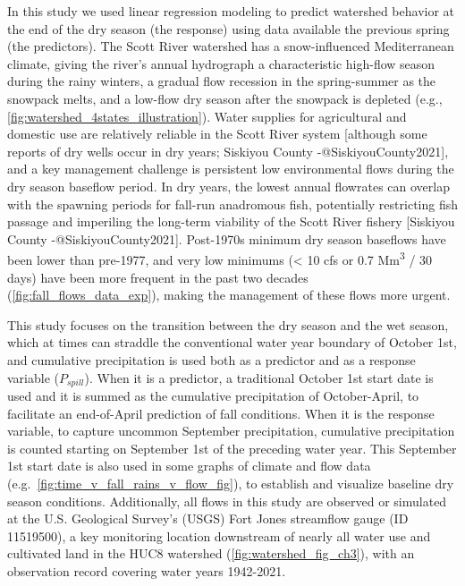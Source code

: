 \documentclass[
]{article}
\begin{document}
In this study we used linear regression modeling to predict watershed
behavior at the end of the dry season (the response) using data
available the previous spring (the predictors). The Scott River
watershed has a snow-influenced Mediterranean climate, giving the
river's annual hydrograph a characteristic high-flow season during the
rainy winters, a gradual flow recession in the spring-summer as the
snowpack melts, and a low-flow dry season after the snowpack is depleted
(e.g., \autoref{fig:watershed_4states_illustration}). Water supplies for
agricultural and domestic use are relatively reliable in the Scott River
system {[}although some reports of dry wells occur in dry years;
Siskiyou County -@SiskiyouCounty2021{]}, and a key management challenge
is persistent low environmental flows during the dry season baseflow
period. In dry years, the lowest annual flowrates can overlap with the
spawning periods for fall-run anadromous fish, potentially restricting
fish passage and imperiling the long-term viability of the Scott River
fishery {[}Siskiyou County -@SiskiyouCounty2021{]}. Post-1970s minimum
dry season baseflows have been lower than pre-1977, and very low
minimums (\textless{} 10 cfs or 0.7 Mm\textsuperscript{3} / 30 days)
have been more frequent in the past two decades
(\autoref{fig:fall_flows_data_exp}), making the management of these
flows more urgent.

This study focuses on the transition between the dry season and the wet
season, which at times can straddle the conventional water year boundary
of October 1st, and cumulative precipitation is used both as a predictor
and as a response variable (\(P_{spill}\)). When it is a predictor, a
traditional October 1st start date is used and it is summed as the
cumulative precipitation of October-April, to facilitate an end-of-April
prediction of fall conditions. When it is the response variable, to
capture uncommon September precipitation, cumulative precipitation is
counted starting on September 1st of the preceding water year. This
September 1st start date is also used in some graphs of climate and flow
data (e.g.~\autoref{fig:time_v_fall_rains_v_flow_fig}), to establish and
visualize baseline dry season conditions. Additionally, all flows in
this study are observed or simulated at the U.S. Geological Survey's
(USGS) Fort Jones streamflow gauge (ID 11519500), a key monitoring
location downstream of nearly all water use and cultivated land in the
HUC8 watershed (\autoref{fig:watershed_fig_ch3}), with an observation
record covering water years 1942-2021.
\end{document}
